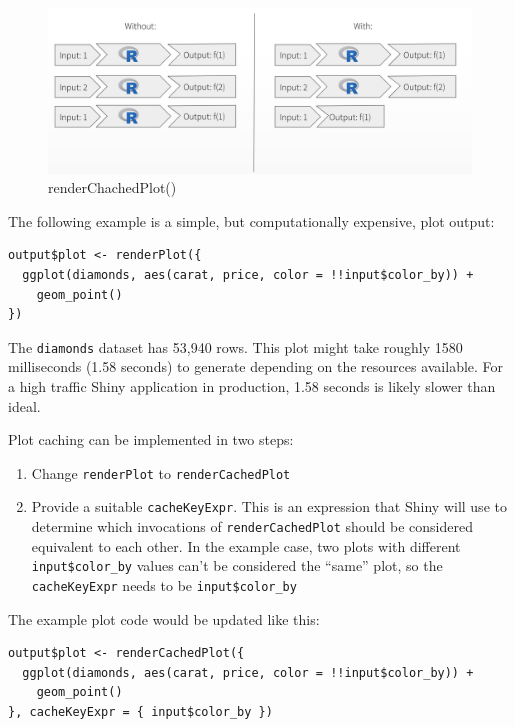 \documentclass[]{book}
\providecommand{\tightlist}{%
  \setlength{\itemsep}{0pt}\setlength{\parskip}{0pt}}
\theoremstyle{definition}
\theoremstyle{definition}
\theoremstyle{definition}
\theoremstyle{remark}
\begin{document}
\begin{figure}
\centering
\includegraphics{imgs/plotcaching/rendercachedplot.png}
\caption{renderChachedPlot()}
\end{figure}

The following example is a simple, but computationally expensive, plot
output:

\begin{verbatim}
output$plot <- renderPlot({
  ggplot(diamonds, aes(carat, price, color = !!input$color_by)) +
    geom_point()
})
\end{verbatim}

The \texttt{diamonds} dataset has 53,940 rows. This plot might take
roughly 1580 milliseconds (1.58 seconds) to generate depending on the
resources available. For a high traffic Shiny application in production,
1.58 seconds is likely slower than ideal.

Plot caching can be implemented in two steps:

\begin{enumerate}
\def\labelenumi{\arabic{enumi}.}
\tightlist
\item
  Change \texttt{renderPlot} to \texttt{renderCachedPlot}
\item
  Provide a suitable \texttt{cacheKeyExpr}. This is an expression that
  Shiny will use to determine which invocations of
  \texttt{renderCachedPlot} should be considered equivalent to each
  other. In the example case, two plots with different
  \texttt{input\$color\_by} values can't be considered the ``same''
  plot, so the \texttt{cacheKeyExpr} needs to be
  \texttt{input\$color\_by}
\end{enumerate}

The example plot code would be updated like this:

\begin{verbatim}
output$plot <- renderCachedPlot({
  ggplot(diamonds, aes(carat, price, color = !!input$color_by)) +
    geom_point()
}, cacheKeyExpr = { input$color_by })
\end{verbatim}
\end{document}
